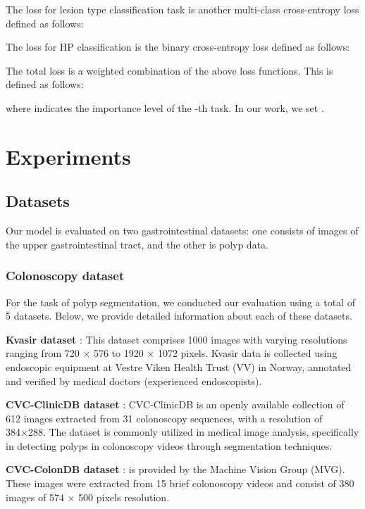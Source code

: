 \documentclass{article}
\begin{document}
The loss  for lesion type classification task is another multi-class cross-entropy loss defined as follows:



The loss  for HP classification is the binary cross-entropy loss defined as follows:



The total loss is a weighted combination of the above loss functions. This is defined as follows:

where  indicates the importance level of the -th task. In our work, we set .


\section{Experiments} \label{sec:Experiments}
\subsection{Datasets}
Our model is evaluated on two gastrointestinal datasets: one consists of images of the upper gastrointestinal tract, and the other is polyp data. 



\subsubsection{Colonoscopy dataset}


For the task of polyp segmentation, we conducted our evaluation using a total of 5 datasets. Below, we provide detailed information about each of these datasets.

\textbf{Kvasir dataset} \cite{Kvasir}: This dataset comprises 1000 images with varying resolutions ranging from 720 × 576 to 1920 × 1072 pixels. Kvasir data is collected using endoscopic equipment at Vestre Viken Health Trust (VV) in Norway, annotated and verified by medical doctors (experienced endoscopists).

\textbf{CVC-ClinicDB dataset} \cite{Clinic}: CVC-ClinicDB is an openly available collection of 612 images extracted from 31 colonoscopy sequences, with a resolution of 384×288. The dataset is commonly utilized in medical image analysis, specifically in detecting polyps in colonoscopy videos through segmentation techniques.

\textbf{CVC-ColonDB dataset} \cite{Colon}: is provided by the Machine Vision Group (MVG). These images were extracted from 15 brief colonoscopy videos and consist of 380 images of 574 × 500 pixels resolution.
\end{document}
